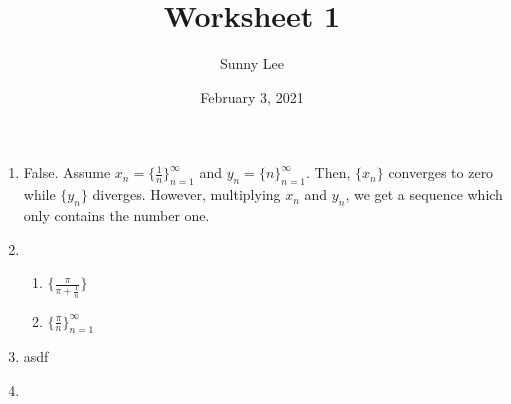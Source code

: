 \documentclass{article}
\title{Worksheet 1}
\author{Sunny Lee}
\date{February 3, 2021}
\begin{document}
\begin{enumerate}
    \item False. Assume ${x_n}=\{\frac{1}{n}\}^{\infty}_{n=1}$ and 
    ${y_n}=\{n\}^{\infty}_{n=1}$. Then, $\{x_n\}$ 
    converges to zero while $\{y_n\}$ diverges. However, multiplying $x_n$ and $y_n$, 
    we get a sequence which only contains the number one.

    \item
    \begin{enumerate}
        \item 
        $\{\frac{\pi}{\pi + \frac{1}{n}}\}$

        \item 
        $\{\frac{\pi}{n}\}^{\infty}_{n=1}$
    \end{enumerate}

    \item asdf

    \item 
\end{enumerate}
\end{document}
